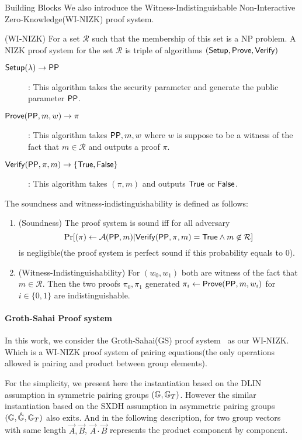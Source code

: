\begin{subsection}{Building Blocks}
    We also introduce the Witness-Indistinguishable Non-Interactive Zero-Knowledge(WI-NIZK) proof system.
    \begin{myDef}{(WI-NIZK)} For a set $\mathcal{R}$ such that the membership of this set is a NP problem. A NIZK proof system for the set $\mathcal{R}$ is triple of algorithms $({\mathsf{Setup}}, {\mathsf{Prove}}, {\mathsf{Verify}})$
      \begin{description}
      \item[$\boldmath{{\mathsf{Setup}}(\lambda) \to \mathsf{PP}}$]: This algorithm takes the security parameter and generate the public parameter $\mathsf{PP}$. 
      \item[$\boldmath{{\mathsf{Prove}}(\mathsf{PP}, m, w) \to \pi}$]: This algorithm takes $\mathsf{PP}, m, w$ where $w$ is suppose to be a witness of the fact that $m \in \mathcal{R}$ and outputs a proof $\pi$. 
      \item[$\boldmath{{\mathsf{Verify}}(\mathsf{PP}, \pi, m) \to \{\mathsf{True}, \mathsf{False}\}}$]: This algorithm takes $(\pi, m)$ and outputs $\mathsf{True}$ or $\mathsf{False}$.
      \end{description}

      The soundness and witness-indistinguishability is defined as follows:
      \begin{enumerate}
      \item (Soundness) The proof system is sound iff for all adversary
        $$\operatorname{Pr}[(\pi) \gets \mathcal{A}(\mathsf{PP}, m)| {\mathsf{Verify}}(\mathsf{PP}, \pi, m) = \mathsf{True} \wedge m \not \in \mathcal{R}]$$
        is negligible(the proof system is perfect sound if this probability equals to $0$).
      \item (Witness-Indistinguishability) For $(w_0, w_1)$ both are witness of the fact that $m \in \mathcal{R}$. Then the two proofs $\pi_0, \pi_1$ generated $\pi_i \gets {\mathsf{Prove}}(\mathsf{PP}, m, w_i)$ for $i \in \{0,1\}$ are indistinguishable.
      \end{enumerate}
      
     
      
    \end{myDef}


    \paragraph{Groth-Sahai Proof system}
    In this work, we consider the Groth-Sahai(GS) proof system~\cite{DBLP:journals/eccc/GrothS07} as our WI-NIZK. Which is a WI-NIZK proof system of pairing equations(the only operations allowed is pairing and product between group elements).

    For the simplicity, we present here the instantiation based on the DLIN assumption in symmetric pairing groups $(\mathbb{G}, \mathbb{G}_T)$. However the similar instantiation based on the SXDH assumption in asymmetric pairing groups $(\mathbb{G}, \hat{\mathbb{G}}, \mathbb{G}_T)$ also exits. And in the following description, for two group vectors with same length $\vec{A}, \vec{B}$, $\vec{A} \cdot \vec{B}$ represents the product component by component.
    

\end{subsection}
